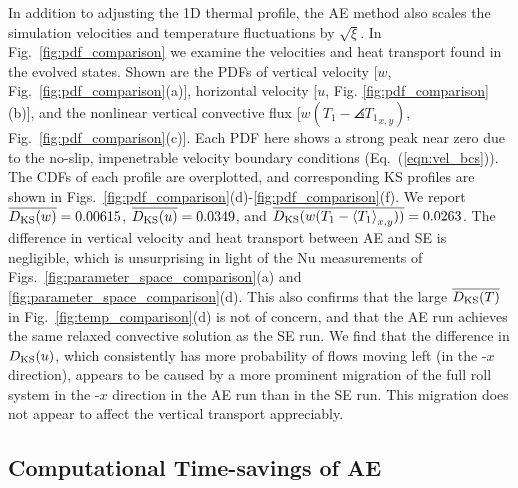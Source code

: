 In addition to adjusting the 1D thermal profile, the AE method also scales the simulation velocities and temperature fluctuations by $\sqrt{\xi}$. 
In Fig.~\ref{fig:pdf_comparison} we examine the velocities and heat transport found in the evolved states.
Shown are the PDFs of vertical velocity [$w$, Fig.~\ref{fig:pdf_comparison}(a)], horizontal velocity [$u$, Fig. \ref{fig:pdf_comparison}(b)], and the nonlinear vertical convective flux [$w(T_1 - \angles{T_1}_{x,y})$, Fig.~\ref{fig:pdf_comparison}(c)]. 
Each PDF here shows a strong peak near zero due to the no-slip, impenetrable velocity boundary conditions (Eq.~(\ref{eqn:vel_bcs})).
The CDFs of each profile are overplotted, and corresponding KS profiles are shown in Figs.~\ref{fig:pdf_comparison}(d)-\ref{fig:pdf_comparison}(f).  
We report $\overline{D_\text{KS}(w)} = 0.00615$, $\overline{D_\text{KS}(u)} = 0.0349$, and $\overline{D_\text{KS}(w(T_1 - \left\langle T_1 \right\rangle_{x,y}))} = 0.0263$.
The difference in vertical velocity and heat transport between AE and SE is negligible, which is unsurprising in light of the Nu measurements of Figs.~\ref{fig:parameter_space_comparison}(a) and \ref{fig:parameter_space_comparison}(d).
This also confirms that the large $\overline{D_\text{KS}(T)}$ in Fig.~\ref{fig:temp_comparison}(d) is not of concern, and that the AE run achieves the same relaxed convective solution as the SE run.
We find that the difference in $D_{\text{KS}}(u)$, which consistently has more probability of flows moving left (in the -$x$ direction), appears to be caused by a more prominent migration of the full roll system in the -$x$ direction in the AE run than in the SE run. 
This migration does not appear to affect the vertical transport appreciably.


\subsection{Computational Time-savings of AE}
\label{sec:abo18_speedups}

